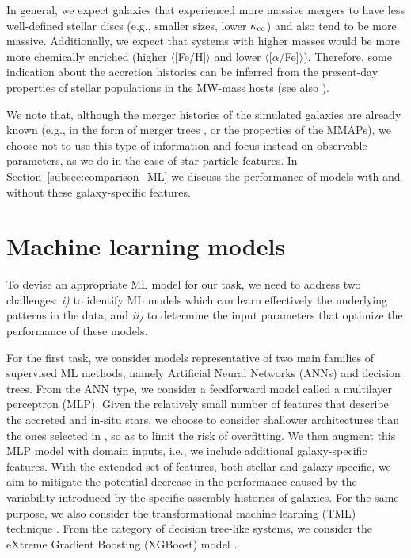 In general, we expect galaxies that experienced more massive mergers to have less well-defined stellar discs (e.g., smaller sizes, lower $\kappa_{\rm co}$) and also tend to be more massive. Additionally, we expect that systems with higher masses would be more more chemically enriched (higher $\langle$[Fe/H]$\rangle$ and lower $\langle$[$\alpha$/Fe]$\rangle$). Therefore, some indication about the accretion histories can be inferred from the present-day properties of stellar populations in the MW-mass hosts (see also
\citealt{Grimozzi2024}).

We note that, although the merger histories of the simulated galaxies are already known (e.g., in the form of merger trees , or the properties of the MMAPs), we choose not to use this type of information and focus instead on observable parameters, as we do in the case of star particle features. In Section~\ref{subsec:comparison_ML} we discuss the performance of models with and without these galaxy-specific features.

\section{Machine learning models}
\label{sec:ML}

To devise an appropriate ML model for our task, we need to address two challenges: {\it i)} to identify ML models which can learn effectively the underlying patterns in the data; and {\it ii)} to determine the input parameters that optimize the performance of these models.

For the first task, we consider models representative of two main families of supervised ML methods, namely Artificial Neural Networks (ANNs) and decision trees. From the ANN type, we consider a feedforward model called a multilayer perceptron (MLP). Given the relatively small number of features that describe the accreted and in-situ stars, we choose to consider shallower architectures than the ones selected in \citet{Tronrud2022}, so as to limit the risk of overfitting. We then augment this MLP model with domain inputs, i.e., we include additional galaxy-specific features. With the extended set of features, both stellar and galaxy-specific, we aim to mitigate the potential decrease in the performance caused by the variability introduced by the specific assembly histories of galaxies. For the same purpose, we also consider the transformational machine learning (TML) technique \citep{Olier2021}. From the category of decision tree-like systems, we consider the eXtreme Gradient Boosting (XGBoost) model \citep{Chen2016}.

